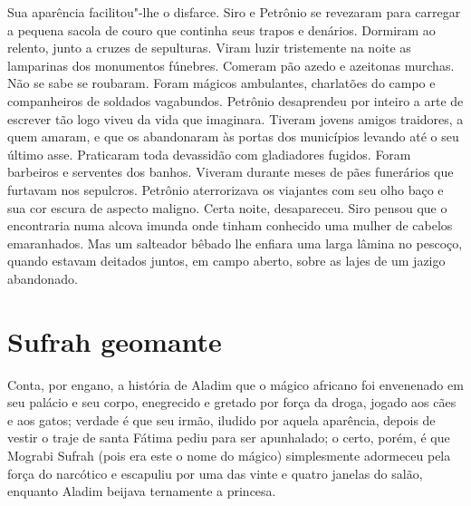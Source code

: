 Sua aparência facilitou"-lhe o disfarce. Siro e Petrônio se revezaram para
carregar a pequena sacola de couro que continha seus trapos e denários.
Dormiram ao relento, junto a cruzes de sepulturas. Viram luzir tristemente
na noite as lamparinas dos monumentos fúnebres. Comeram pão azedo e
azeitonas murchas. Não se sabe se roubaram. Foram mágicos ambulantes,
charlatões do campo e companheiros de soldados vagabundos. Petrônio
desaprendeu por inteiro a arte de escrever tão logo viveu da vida que
imaginara. Tiveram jovens amigos traidores, a quem amaram, e que os
abandonaram às portas dos municípios levando até o seu último asse.
Praticaram toda devassidão com gladiadores fugidos. Foram barbeiros e
serventes dos banhos. Viveram durante meses de pães funerários que
furtavam nos sepulcros. Petrônio aterrorizava os viajantes com seu olho
baço e sua cor escura de aspecto maligno. Certa noite, desapareceu. Siro
pensou que o encontraria numa alcova imunda onde tinham conhecido uma
mulher de cabelos emaranhados. Mas um salteador bêbado lhe enfiara uma
larga lâmina no pescoço, quando estavam deitados juntos, em campo aberto,
sobre as lajes de um jazigo abandonado.

\chapter{Sufrah geomante}

Conta, por engano, a história de Aladim que o mágico africano foi
envenenado em seu palácio e seu corpo, enegrecido e gretado por força da
droga, jogado aos cães e aos gatos; verdade é que seu irmão, iludido por
aquela aparência, depois de vestir o traje de santa Fátima pediu para ser
apunhalado; o certo, porém, é que Mograbi Sufrah (pois era este o nome do
mágico) simplesmente adormeceu pela força do narcótico e escapuliu por uma
das vinte e quatro janelas do salão, enquanto Aladim beijava ternamente a
princesa.

